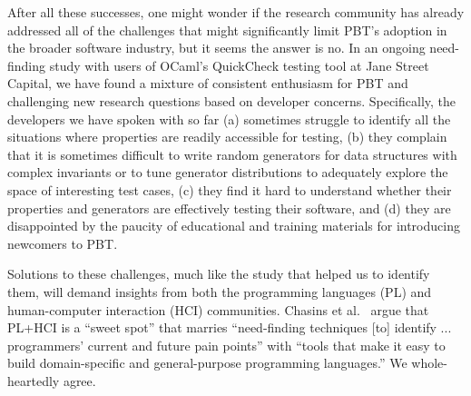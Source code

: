 After all these successes, one might wonder if the research community has already
addressed all of the challenges that might significantly limit PBT's adoption
in the broader software industry, but it
seems the answer is no.
In an ongoing need-finding study with users of OCaml's QuickCheck testing tool
at Jane Street Capital, we have found a
mixture of consistent enthusiasm for PBT
and challenging new research questions based on developer concerns.
Specifically, the developers we have spoken with so far
%
(a) sometimes struggle
to identify all the situations where properties are readily accessible for
testing,
%
(b) they complain that it
is sometimes difficult to write random generators for data structures
with complex invariants or to tune generator distributions to
adequately explore the space of interesting test cases,
%
(c) they find
it hard to understand whether their properties and generators are
effectively testing their software, and
%
(d) they are disappointed by
the paucity of educational and training materials for introducing
newcomers to PBT.\iflater{}\fi

Solutions to these challenges, much like the study that helped us to
identify them, will demand insights from both the programming languages (PL) and
human-computer interaction (HCI) communities.  Chasins et
al.~\cite{chasins_pl_2021} argue that PL+HCI is a ``sweet spot'' that marries
``need-finding techniques [to] identify ...  programmers' current and future
pain points''
with
``tools that make it easy to build domain-specific and
general-purpose programming languages.''
We whole-heartedly agree.

